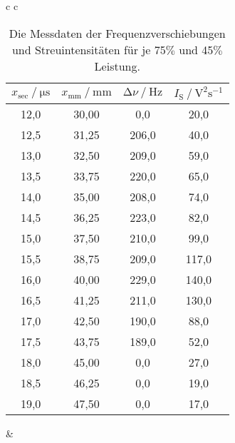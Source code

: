 \begin{table}[H]
  \centering
  \caption{Die Messdaten der Frequenzverschiebungen und Streuintensitäten für je 75$\%$ und 45$\%$ Leistung.}
  \label{tab:profil}

  \begin{tabular}{c c}   %
      \begin{tabular}{c c c c} 
          \hline
          \toprule
          $x_\text{sec} \mathbin{/} \unit{\micro\second}$ &
          $x_\text{mm} \mathbin{/} \unit{\milli\meter}$ &
          $\increment \nu \mathbin{/} \mathrm{Hz}$ &
          $I_\text{S} \mathbin{/} \mathrm{V^2 s^{-1}}$ \\
          \midrule
          12,0 & 30,00 &   0,0 &  20,0 \\
          12,5 & 31,25 & 206,0 &  40,0 \\
          13,0 & 32,50 & 209,0 &  59,0 \\
          13,5 & 33,75 & 220,0 &  65,0 \\
          14,0 & 35,00 & 208,0 &  74,0 \\
          14,5 & 36,25 & 223,0 &  82,0 \\
          15,0 & 37,50 & 210,0 &  99,0 \\
          15,5 & 38,75 & 209,0 & 117,0 \\
          16,0 & 40,00 & 229,0 & 140,0 \\
          16,5 & 41,25 & 211,0 & 130,0 \\
          17,0 & 42,50 & 190,0 &  88,0 \\
          17,5 & 43,75 & 189,0 &  52,0 \\
          18,0 & 45,00 &   0,0 &  27,0 \\
          18,5 & 46,25 &   0,0 &  19,0 \\
          19,0 & 47,50 &   0,0 &  17,0 \\
 
          \bottomrule
          \hline
      \end{tabular} &  %


\end{tabular}
\end{table}
